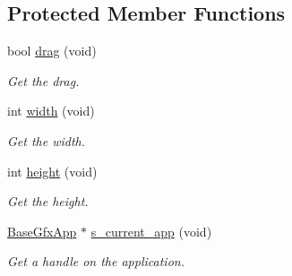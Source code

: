 \subsection*{Protected Member Functions}
\begin{DoxyCompactItemize}
\item 
bool \hyperlink{classimage__tools_1_1BaseGfxApp_ac5a0a94bb2c4ca05f5a679c0184fbaa2}{drag} (void)
\begin{DoxyCompactList}\small\item\em Get the drag. \end{DoxyCompactList}\item 
int \hyperlink{classimage__tools_1_1BaseGfxApp_a5d2fdba549f7f6c8151e11d278486810}{width} (void)
\begin{DoxyCompactList}\small\item\em Get the width. \end{DoxyCompactList}\item 
int \hyperlink{classimage__tools_1_1BaseGfxApp_af7fe3673933f4965f42907c9abda3368}{height} (void)
\begin{DoxyCompactList}\small\item\em Get the height. \end{DoxyCompactList}\item 
\hyperlink{classimage__tools_1_1BaseGfxApp}{Base\+Gfx\+App} $\ast$ \hyperlink{classimage__tools_1_1BaseGfxApp_aaf2b80d7444f6ace46f7a412ebda01fd}{s\+\_\+current\+\_\+app} (void)
\begin{DoxyCompactList}\small\item\em Get a handle on the application. \end{DoxyCompactList}\end{DoxyCompactItemize}
